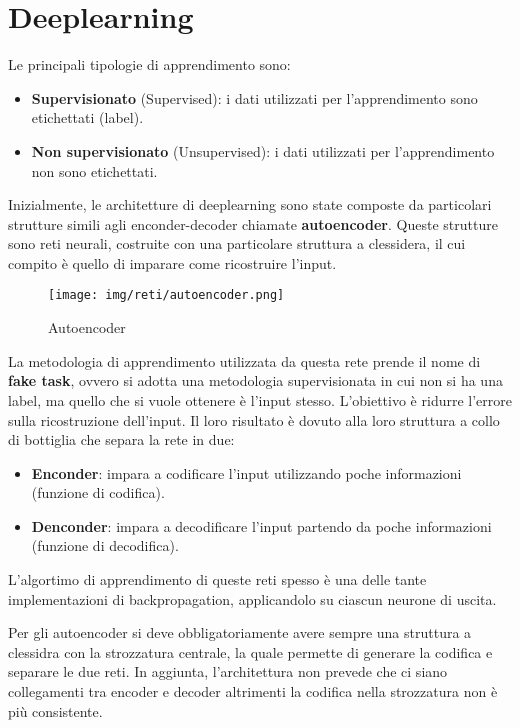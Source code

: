 \chapter{Deeplearning}
Le principali tipologie di apprendimento sono:
\begin{itemize}
    \item \textbf{Supervisionato} (Supervised): i dati utilizzati per l'apprendimento
          sono etichettati (label).
    \item \textbf{Non supervisionato} (Unsupervised): i dati utilizzati per
          l'apprendimento non sono etichettati.
\end{itemize}
Inizialmente, le architetture di deeplearning sono state composte da particolari
strutture simili agli enconder-decoder chiamate \textbf{autoencoder}. Queste
strutture sono reti neurali, costruite con una particolare struttura a clessidera,
il cui compito è quello di imparare come ricostruire l'input.
\begin{figure}[!ht]
    \centering
    \texttt{[image: img/reti/autoencoder.png]}
    \caption{Autoencoder}
    \label{fig:autoencoder}
\end{figure}
La metodologia di apprendimento utilizzata da questa rete prende il nome di
\textbf{fake task}, ovvero si adotta una metodologia supervisionata in cui non si
ha una label, ma quello che si vuole ottenere è l'input stesso. L'obiettivo
è ridurre l'errore sulla ricostruzione dell'input. Il loro risultato è dovuto
alla loro struttura a collo di bottiglia che separa la rete in due:
\begin{itemize}
    \item \textbf{Enconder}: impara a codificare l'input utilizzando poche
          informazioni (funzione di codifica).
    \item \textbf{Denconder}: impara a decodificare l'input partendo da poche
          informazioni (funzione di decodifica).
\end{itemize}
L'algortimo di apprendimento di queste reti spesso è una delle tante implementazioni
di backpropagation, applicandolo su ciascun neurone di uscita.

Per gli autoencoder si deve obbligatoriamente avere sempre una struttura a clessidra
con la strozzatura centrale, la quale permette di generare la codifica e separare
le due reti. In aggiunta, l'architettura non prevede che ci siano collegamenti
tra encoder e decoder altrimenti la codifica nella strozzatura non è più consistente.

